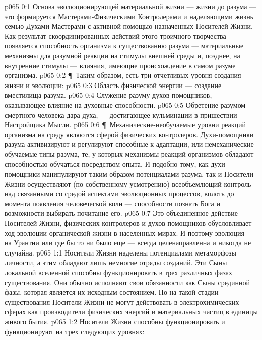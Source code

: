 \author{Носитель Жизни}
\vs p065 0:1 Основа эволюционирующей материальной жизни --- жизни до разума --- это формируется Мастерами\hyp{}Физическими Контролерами и наделяющими жизнь семью Духами\hyp{}Мастерами с активной помощью назначенных Носителей Жизни. Как результат скоординированных действий этого троичного творчества появляется способность организма к существованию разума --- материальные механизмы для разумной реакции на стимулы внешней среды и, позднее, на внутренние стимулы --- влияния, имеющие происхождение в самом разуме организма.
\vs p065 0:2 \P\ Таким образом, есть три отчетливых уровня создания жизни и эволюции:
\vs p065 0:3 \bibnobreakspace Область физической энергии --- создание вместилища разума.
\vs p065 0:4 \bibnobreakspace Служение разуму духов\hyp{}помощников, --- оказывающее влияние на духовные способности.
\vs p065 0:5 \bibnobreakspace Обретение разумом смертного человека дара духа, --- достигающее кульминации в пришествии Настройщика Мысли.
\vs p065 0:6 \P\ Механические\hyp{}необучаемые уровни реакций организма на среду являются сферой физических контролеров. Духи\hyp{}помощники разума активизируют и регулируют способные к адаптации, или немеханические\hyp{}обучаемые типы разума, те, у которых механизмы реакций организмов обладают способностью обучаться посредством опыта. И подобно тому, как духи\hyp{}помощники манипулируют таким образом потенциалами разума, так и Носители Жизни осуществляют (по собственному усмотрению) всеобъемлющий контроль над связанными со средой аспектами эволюционных процессов, вплоть до момента появления человеческой воли --- способности познать Бога и возможности выбирать почитание его.
\vs p065 0:7 Это объединенное действие Носителей Жизни, физических контролеров и духов\hyp{}помощников обусловливает ход эволюции органической жизни в населенных мирах. И поэтому эволюция --- на Урантии или где бы то ни было еще --- всегда целенаправленна и никогда не случайна.
\vs p065 1:1 Носители Жизни наделены потенциалами метаморфозы личности, а этим обладают лишь немногие отряды созданий. Эти Сыны локальной вселенной способны функционировать в трех различных фазах существования. Они обычно исполняют свои обязанности как Сыны срединной фазы, которая является их исходным состоянием. Но на такой стадии существования Носители Жизни не могут действовать в электрохимических сферах как производители физических энергий и материальных частиц в единицы живого бытия.
\vs p065 1:2 Носители Жизни способны функционировать и функционируют на трех следующих уровнях:
